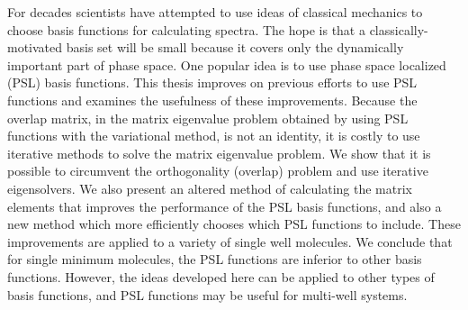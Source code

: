 For decades scientists have attempted to use ideas of classical mechanics to choose basis functions
for calculating spectra. The hope is that a classically-motivated basis set will be small because it
covers only the dynamically important part of phase space. One popular idea is to use phase space 
localized (PSL) basis functions. This thesis improves on previous efforts to use PSL functions and 
examines the usefulness of these improvements. Because  the overlap matrix, in the matrix eigenvalue 
problem obtained by using PSL functions with the variational method, is not an identity, it is costly 
to use iterative methods
to solve the matrix eigenvalue problem. We show that it is possible to circumvent
the orthogonality (overlap) problem and use iterative eigensolvers. We also present an altered method of calculating the matrix elements that
improves the performance of the PSL basis functions, and also a new method which more efficiently chooses which
PSL functions to include. These improvements are applied to a variety of single well molecules. We conclude that for single minimum molecules, the PSL functions are inferior to other basis functions.  However, the ideas developed here can be applied to other types of basis functions, and PSL functions may be useful for multi-well systems. 